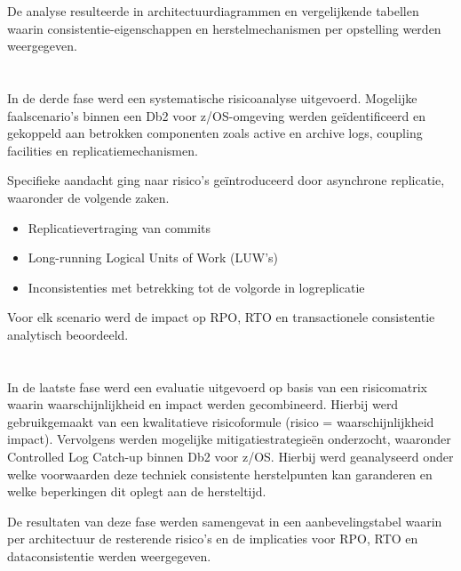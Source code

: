 De analyse resulteerde in architectuurdiagrammen en vergelijkende tabellen waarin consistentie-eigenschappen en herstelmechanismen per opstelling werden weergegeven.

\section{}%
\label{sec:methodologie-risicoanalyse}

In de derde fase werd een systematische risicoanalyse uitgevoerd. 
Mogelijke faalscenario's binnen een Db2 voor z/OS-omgeving werden geïdentificeerd en gekoppeld aan betrokken componenten zoals active en archive logs, coupling facilities en replicatiemechanismen.

Specifieke aandacht ging naar risico's geïntroduceerd door asynchrone replicatie, waaronder de volgende zaken.
\begin{itemize}
    \item Replicatievertraging van commits
    \item Long-running Logical Units of Work (LUW's)
    \item Inconsistenties met betrekking tot de volgorde in logreplicatie
\end{itemize}

Voor elk scenario werd de impact op RPO, RTO en transactionele consistentie analytisch beoordeeld.

\section{}%
\label{sec:methodologie-evaluatie-mitigatie}

In de laatste fase werd een evaluatie uitgevoerd op basis van een risicomatrix waarin waarschijnlijkheid en impact werden gecombineerd. 
Hierbij werd gebruikgemaakt van een kwalitatieve risicoformule (risico = waarschijnlijkheid \times impact).
Vervolgens werden mogelijke mitigatiestrategieën onderzocht, waaronder Controlled Log Catch-up binnen Db2 voor z/OS\@. 
Hierbij werd geanalyseerd onder welke voorwaarden deze techniek consistente herstelpunten kan garanderen en welke beperkingen dit oplegt aan de hersteltijd.

De resultaten van deze fase werden samengevat in een aanbevelingstabel waarin per architectuur de resterende risico's en de implicaties voor RPO, RTO en dataconsistentie werden weergegeven.

